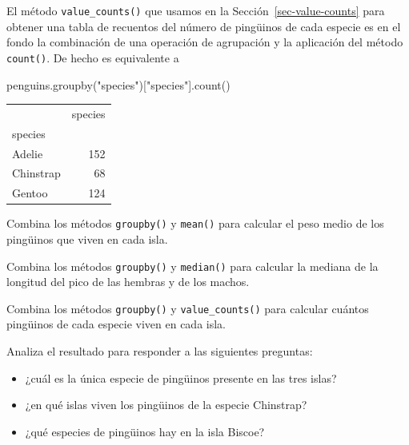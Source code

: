 \documentclass[
  a4paper,
  noprof,
  12pt,
  notoc,
  nosols,
  nobib]{mnye}
\newenvironment{Shaded}{\begin{snugshade}}{\end{snugshade}}
\newcommand{\NormalTok}[1]{\textcolor[rgb]{0.00,0.23,0.31}{#1}}
\newcommand{\StringTok}[1]{\textcolor[rgb]{0.13,0.47,0.30}{#1}}
\providecommand{\tightlist}{%
  \setlength{\itemsep}{0pt}\setlength{\parskip}{0pt}}\usepackage{longtable,booktabs,array}
\renewenvironment{exercise}[1][]{
            \if\relax\detokenize{#1}\relax
                \ex
            \else
                \ex[note={#1}]
            \fi
        }{\endex}
\theoremstyle{definition}
\newtheorem{exercise}{Ejercicio}[section]
\theoremstyle{remark}
\begin{document}
El método \texttt{value\_counts()} que usamos en la
Sección~\ref{sec-value-counts} para obtener una tabla de recuentos del
número de pingüinos de cada especie es en el fondo la combinación de una
operación de agrupación y la aplicación del método \texttt{count()}. De
hecho es equivalente a

\begin{Shaded}
\begin{Highlighting}[]
\NormalTok{penguins.groupby(}\StringTok{"species"}\NormalTok{)[}\StringTok{"species"}\NormalTok{].count()}
\end{Highlighting}
\end{Shaded}

\begin{tabular}{lr}
\toprule
{} &  species \\
species   &          \\
\midrule
Adelie    &      152 \\
Chinstrap &       68 \\
Gentoo    &      124 \\
\bottomrule
\end{tabular}

\begin{exercise}[]%
\protect\hypertarget{exr-groupby-mean}{}\label{exr-groupby-mean}%
Combina los métodos \texttt{groupby()} y \texttt{mean()} para calcular
el peso medio de los pingüinos que viven en cada isla.

\end{exercise}

\begin{exercise}[]%
\protect\hypertarget{exr-groupby-max}{}\label{exr-groupby-max}%
Combina los métodos \texttt{groupby()} y \texttt{median()} para calcular
la mediana de la longitud del pico de las hembras y de los machos.

\end{exercise}

\begin{exercise}[]%
\protect\hypertarget{exr-groupby-value_counts}{}\label{exr-groupby-value_counts}%
Combina los métodos \texttt{groupby()} y \texttt{value\_counts()} para
calcular cuántos pingüinos de cada especie viven en cada isla.

Analiza el resultado para responder a las siguientes preguntas:

\begin{itemize}
\tightlist
\item
  ¿cuál es la única especie de pingüinos presente en las tres islas?
\item
  ¿en qué islas viven los pingüinos de la especie Chinstrap?
\item
  ¿qué especies de pingüinos hay en la isla Biscoe?
\end{itemize}

\end{exercise}
\end{document}
